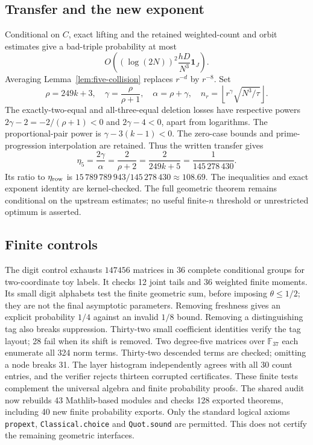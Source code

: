 \documentclass[11pt]{article}
\begin{document}
\subsection{Transfer and the new exponent}
Conditional on $C$, exact lifting and the retained weighted-count and orbit
estimates give a bad-triple probability at most
\[
 O\left((\log(2N))^2\frac{hD}{N^3}\mathbf1_J\right).
\]
Averaging Lemma~\ref{lem:five-collision} replaces $r^{-d}$ by $r^{-8}$.
Set
\[
 \rho=249k+3,\quad \gamma=\frac{\rho}{\rho+1},\quad
 \alpha=\rho+\gamma,\quad
 n_r=\left\lfloor r^\gamma\sqrt{N^3/\tau}\right\rfloor.
\]
The exactly-two-equal and all-three-equal deletion losses have respective
powers $2\gamma-2=-2/(\rho+1)<0$ and $2\gamma-4<0$, apart from logarithms.
The proportional-pair power is $\gamma-3(k-1)<0$.
The zero-case bounds and prime-progression interpolation are retained.
Thus the written transfer gives
\[
 \boxed{\eta_5=\frac{2\gamma}{\alpha}=\frac2{\rho+2}
       =\frac2{249k+5}=\frac1{145\,278\,430}.}
\]
Its ratio to $\eta_{\rm row}$ is
$15\,789\,789\,943/145\,278\,430\approx108.69$.
The inequalities and exact exponent identity are kernel-checked.
The full geometric theorem remains conditional on the upstream estimates;
no useful finite-$n$ threshold or unrestricted optimum is asserted.

\subsection{Finite controls}
The digit control exhausts $147456$ matrices in 36 complete conditional
groups for two-coordinate toy labels. It checks 12 joint tails and 36
weighted finite moments. Its small digit alphabets test the finite
geometric sum, before imposing $\theta\le1/2$; they are not the final
asymptotic parameters. Removing freshness gives an explicit probability
$1/4$ against an invalid $1/8$ bound. Removing a distinguishing tag also
breaks suppression. Thirty-two small coefficient identities verify the
tag layout; 28 fail when its shift is removed.
Two degree-five matrices over $\mathbb F_{37}$ each enumerate all 324 norm
terms. Thirty-two descended terms are checked; omitting a node breaks 31.
The layer histogram independently agrees with all 30 count entries, and
the verifier rejects thirteen corrupted certificates. These finite tests
complement the universal algebra and finite probability proofs. The shared
audit now rebuilds 43 Mathlib-based modules and checks 128 exported theorems,
including 40 new finite probability exports. Only the standard logical
axioms \texttt{propext}, \texttt{Classical.choice} and \texttt{Quot.sound}
are permitted. This does not certify the remaining geometric interfaces.
\end{document}
